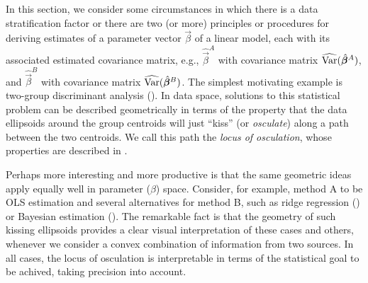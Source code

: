 %

In this section, we consider some circumstances in which there is a data stratification factor or there are two (or more)
principles or procedures for deriving estimates of a parameter vector $\vec{\beta}$
of a linear model,
each with its associated estimated covariance matrix, e.g.,
$\widehat{\vec{\beta}}^A$ with covariance matrix $\widehat{\mathrm{Var}}(\hat{\bm{\beta}}^A)$,
and
$\widehat{\vec{\beta}}^B$ with covariance matrix $\widehat{\mathrm{Var}}(\hat{\bm{\beta}}^B)$.
The simplest motivating example is two-group discriminant analysis ().
In data space, solutions to this statistical problem can be described geometrically
in terms of the property that the data ellipsoids around the group centroids 
will just ``kiss''
(or \emph{osculate}) along a path between the two centroids. We call this path
the \emph{locus of osculation}, whose properties are described in .

Perhaps more interesting and more productive is that the same geometric ideas
apply equally well in parameter ($\beta$) space. Consider, for example,
method A to be OLS estimation and several alternatives
for method B, such as ridge regression () or Bayesian estimation
(). The remarkable fact is that the geometry of such kissing
ellipsoids provides a clear visual interpretation of these cases and others,
whenever we consider a convex combination of information from two sources. In all cases,
the locus of osculation is interpretable in
terms of the statistical goal to be achived, taking precision into account.


